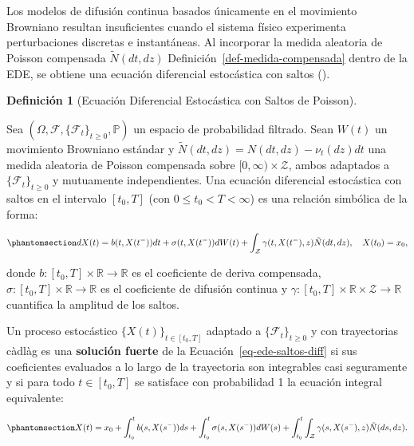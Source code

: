 \documentclass[
  spanish,
  letterpaper,
  DIV=11,
  numbers=noendperiod]{scrreprt}
\theoremstyle{plain}
\theoremstyle{plain}
\theoremstyle{plain}
\theoremstyle{definition}
\newtheorem{definition}{Definición}[chapter]
\theoremstyle{remark}
\begin{document}
Los modelos de difusión continua basados únicamente en el movimiento
Browniano resultan insuficientes cuando el sistema físico experimenta
perturbaciones discretas e instantáneas. Al incorporar la medida
aleatoria de Poisson compensada \(\tilde{N}(dt, dz)\)
Definición~\ref{def-medida-compensada} dentro de la EDE, se obtiene una
ecuación diferencial estocástica con saltos
().

\begin{definition}[Ecuación Diferencial Estocástica con Saltos de
Poisson]\protect\hypertarget{def-ede-saltos}{}\label{def-ede-saltos}

Sea \((\Omega, \mathcal{F}, \{\mathcal{F}_t\}_{t \ge 0}, \mathbb{P})\)
un espacio de probabilidad filtrado. Sean \(W(t)\) un movimiento
Browniano estándar y \(\tilde{N}(dt, dz) = N(dt, dz) - \nu_t(dz)dt\) una
medida aleatoria de Poisson compensada sobre
\([0, \infty) \times \mathcal{Z}\), ambos adaptados a
\(\{\mathcal{F}_t\}_{t \ge 0}\) y mutuamente independientes. Una
ecuación diferencial estocástica con saltos en el intervalo \([t_0, T]\)
(con \(0 \leq t_0 < T < \infty\)) es una relación simbólica de la forma:

\begin{equation}\phantomsection\label{eq-ede-saltos-diff}{
dX(t) = b(t, X(t^-)) dt + \sigma(t, X(t^-)) dW(t) + \int_{\mathcal{Z}} \gamma(t, X(t^-), z) \tilde{N}(dt, dz), \quad X(t_0) = x_0,
}\end{equation}

donde \(b: [t_0, T] \times \mathbb{R} \to \mathbb{R}\) es el coeficiente
de deriva compensada,
\(\sigma: [t_0, T] \times \mathbb{R} \to \mathbb{R}\) es el coeficiente
de difusión continua y
\(\gamma: [t_0, T] \times \mathbb{R} \times \mathcal{Z} \to \mathbb{R}\)
cuantifica la amplitud de los saltos.

Un proceso estocástico \(\{X(t)\}_{t \in [t_0, T]}\) adaptado a
\(\{\mathcal{F}_t\}_{t \ge 0}\) y con trayectorias càdlàg es una
\textbf{solución fuerte} de la Ecuación~\ref{eq-ede-saltos-diff} si sus
coeficientes evaluados a lo largo de la trayectoria son integrables casi
seguramente y si para todo \(t \in [t_0, T]\) se satisface con
probabilidad 1 la ecuación integral equivalente:

\begin{equation}\phantomsection\label{eq-ede-saltos-int}{
X(t) = x_0 + \int_{t_0}^t b(s, X(s^-)) ds + \int_{t_0}^t \sigma(s, X(s^-)) dW(s) + \int_{t_0}^t \int_{\mathcal{Z}} \gamma(s, X(s^-), z) \tilde{N}(ds, dz).
}\end{equation}

\end{definition}
\end{document}
